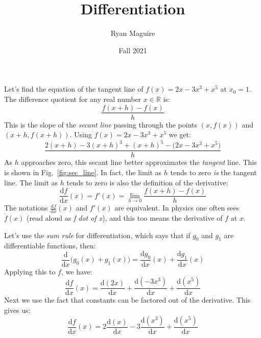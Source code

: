 \documentclass{article}
\title{Differentiation}
\author{Ryan Maguire}
\date{Fall 2021}
\theoremstyle{normal}
\begin{document}
    \maketitle
    Let's find the equation of the tangent line of
    $f(x)=2x-3x^{3}+x^{5}$ at $x_{0}=1$. The difference quotient for any real
    number $x\in\mathbb{R}$ is:
    \begin{equation}
        \frac{f(x+h)-f(x)}{h}
    \end{equation}
    This is the slope of the \textit{secant line} passing through the
    points $(x,f(x))$ and $(x+h,f(x+h))$. Using $f(x)=2x-3x^{3}+x^{5}$ we get:
    \begin{equation}
        \frac{2(x+h)-3(x+h)^{3}+(x+h)^{5}-\big(2x-3x^{3}+x^{5}\big)}{h}
    \end{equation}
    As $h$ approaches zero, this secant line better approximates the
    \textit{tangent} line. This is shown in
    Fig.~\ref{fig:sec_line}. In fact, the limit as $h$ tends to zero
    \textit{is} the tangent line. The limit as $h$ tends to zero is also the
    definition of the derivative:
    \begin{equation}
        \frac{\textrm{d}f}{\textrm{d}x}(x)
            =f'(x)
            =\lim_{h\rightarrow{0}}\frac{f(x+h)-f(x)}{h}
    \end{equation}
    The notations $\frac{\textrm{d}f}{\textrm{d}x}(x)$ and $f'(x)$ are
    equivalent. In physics one often sees $\dot{f}(x)$ (read aloud as
    \textit{f dot of x}), and this too means the derivative of $f$ at $x$.
    \par\hfill\par
    Let's use the \textit{sum rule} for differentiation, which says that if
    $g_{0}$ and $g_{1}$ are differentiable functions, then:
    \begin{equation}
        \frac{\textrm{d}}{\textrm{d}x}\big(g_{0}(x)+g_{1}(x)\big)
        =\frac{\textrm{d}g_{0}}{\textrm{d}x}(x)+
            \frac{\textrm{d}g_{1}}{\textrm{d}x}(x)
    \end{equation}
    Applying this to $f$, we have:
    \begin{equation}
        \frac{\textrm{d}f}{\textrm{d}x}(x)
        =\frac{\textrm{d}(2x)}{\textrm{d}x}+
        \frac{\textrm{d}(-3x^{3})}{\textrm{d}x}+
        \frac{\textrm{d}(x^{5})}{\textrm{d}x}
    \end{equation}
    Next we use the fact that constants can be factored out of the derivative.
    This gives us:
    \begin{equation}
        \frac{\textrm{d}f}{\textrm{d}x}(x)
        =2\frac{\textrm{d}(x)}{\textrm{d}x}-
        3\frac{\textrm{d}(x^{3})}{\textrm{d}x}+
        \frac{\textrm{d}(x^{5})}{\textrm{d}x}
    \end{equation}
\end{document}

